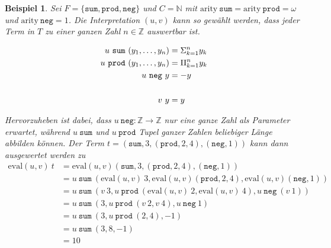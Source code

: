 \newtheorem{bEval}[bsp]{Beispiel}
\begin{bEval} \label{bEval}
Sei $F = \{\texttt{sum}, \texttt{prod}, \texttt{neg} \}$ und $C = \mathbb{N}$ mit $\mathrm{arity}~ \texttt{sum} = \mathrm{arity}~ \texttt{prod} = \omega$ und $\mathrm{arity}~ \texttt{neg} = 1$.
Die Interpretation $(u, v)$ kann so gewählt werden, dass jeder Term in $T$ zu einer ganzen Zahl $n \in \mathbb{Z}$ auswertbar ist.

\begin{equation*}
    \begin{split}
    u~\texttt{sum}  ~({y}_{1}, \dots, {y}_{n}) &= \Sigma_{k = 1}^n y_k\\
    u~\texttt{prod} ~({y}_{1}, \dots, {y}_{n}) &=    \Pi_{k = 1}^n y_k\\
    u~\texttt{neg}~y &= -y\\
    &\\
    v~y &= y
    \end{split}
\end{equation*}

Hervorzuheben ist dabei, dass $u~\texttt{neg} \colon \mathbb Z \rightarrow \mathbb Z$ nur eine ganze Zahl als Parameter erwartet, während $u~\texttt{sum}$ und $u~\texttt{prod}$ Tupel ganzer Zahlen beliebiger Länge abbilden können.
Der Term $t = (\texttt{sum}, 3, (\texttt{prod}, 2, 4), (\texttt{neg}, 1))$ kann dann ausgewertet werden zu 
\begin{equation*}
    \begin{split}
    \mathrm{eval}(u, v)~t &= \mathrm{eval}(u, v) (\texttt{sum}, 3, (\texttt{prod}, 2, 4), (\texttt{neg}, 1)) \\
    &= u~\texttt{sum}~(\mathrm{eval}(u, v)~3, \mathrm{eval}(u, v)(\texttt{prod}, 2, 4),  \mathrm{eval}(u, v) (\texttt{neg}, 1)) \\
    &= u~\texttt{sum}~(v~3, u~\texttt{prod}~(\mathrm{eval}(u, v)~2, \mathrm{eval}(u, v)~4), u~\texttt{neg}~ (v~1)) \\
    &= u~\texttt{sum}~(3, u~\texttt{prod}~(v~2, v~4), u~\texttt{neg}~ 1) \\
    &= u~\texttt{sum}~(3, u~\texttt{prod}~(2, 4), -1) \\
    &= u~\texttt{sum}~( 3, 8, -1) \\
    &= 10 \\
    \end{split}
\end{equation*}
\end{bEval}

